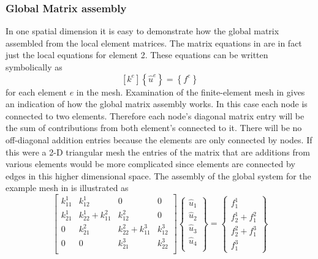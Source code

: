\subsubsection{Global Matrix assembly}
In one spatial dimension it is easy to demonstrate how the global matrix assembled from the local element matrices.  The matrix equations in  are in fact just the local equations for element 2.  These equations can be written symbolically as 
\begin{equation}
\left[k^{e}\right]  \left\{ \hat{u}^{e} \right\} = \left\{ f^{e} \right\}
\end{equation} 
for each element $e$ in the mesh.  Examination of the finite-element mesh in  gives an indication of how the global matrix assembly works.  In this case each node is connected to two elements.  Therefore each node's diagonal matrix entry will be the sum of contributions from both element's connected to it.  There will be no off-diagonal addition entries because the elements are only connected by nodes.  If this were a 2-D triangular mesh the entries of the matrix that are additions from various elements would be more complicated since elements are connected by edges in this higher dimensional space.  The assembly of the global system for the example mesh in  is illustrated as 
\begin{equation}
\left[ 
\begin{array}{cccc}
k^{1}_{11} & k^{1}_{12} & 0 & 0 \\
k^{1}_{21} & k^{1}_{22} + k^{2}_{11}  & k^{2}_{12} & 0 \\
0 & k^{2}_{21} & k^{2}_{22} + k^{3}_{11}  & k^{3}_{12} \\
0 & 0 & k^{3}_{21}  & k^{3}_{22} \\
\end{array}
\right] 
\left\{
\begin{array}{c}
\hat{u}_{1} \\ 
\hat{u}_{2} \\
\hat{u}_{3} \\
\hat{u}_{4} \\
\end{array} 
\right\} = 
\left\{
\begin{array}{c}
f^{1}_{1} \\
f^{1}_{2} + f^{2}_{1} \\ 
f^{2}_{2} + f^{3}_{1} \\
f^{3}_{1}
\end{array}
\right\}
\end{equation}
